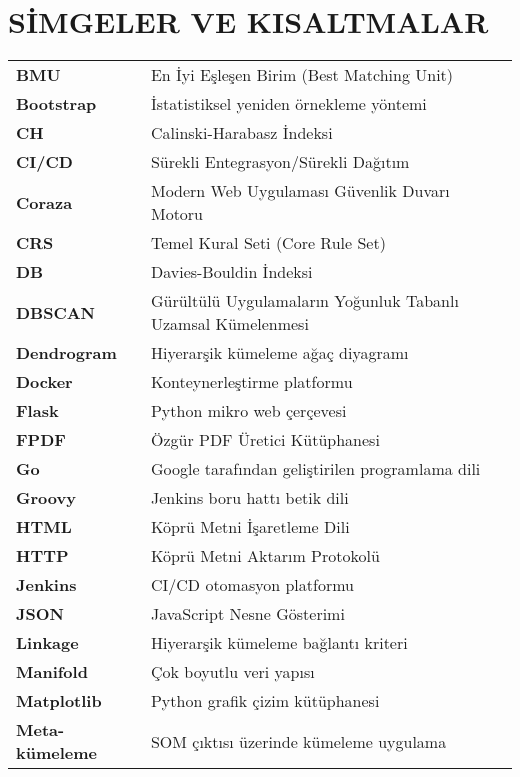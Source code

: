 \section*{SİMGELER VE KISALTMALAR}

\begin{spacing}{1.0}
\begin{longtable}{@{}p{} p{}@{}}
\textbf{BMU}  &	En İyi Eşleşen Birim (Best Matching Unit) \\[1ex]
\textbf{Bootstrap} & İstatistiksel yeniden örnekleme yöntemi \\[1ex]
\textbf{CH} & Calinski-Harabasz İndeksi \\[1ex]
\textbf{CI/CD}  &	Sürekli Entegrasyon/Sürekli Dağıtım \\[1ex]
\textbf{Coraza} & Modern Web Uygulaması Güvenlik Duvarı Motoru \\[1ex]
\textbf{CRS}  &	Temel Kural Seti (Core Rule Set) \\[1ex]
\textbf{DB} & Davies-Bouldin İndeksi \\[1ex]
\textbf{DBSCAN}  &	Gürültülü Uygulamaların Yoğunluk Tabanlı Uzamsal Kümelenmesi \\[1ex]
\textbf{Dendrogram} & Hiyerarşik kümeleme ağaç diyagramı \\[1ex]
\textbf{Docker} & Konteynerleştirme platformu \\[1ex]
\textbf{Flask} & Python mikro web çerçevesi \\[1ex]
\textbf{FPDF}  &	Özgür PDF Üretici Kütüphanesi \\[1ex]
\textbf{Go} & Google tarafından geliştirilen programlama dili \\[1ex]
\textbf{Groovy} & Jenkins boru hattı betik dili \\[1ex]
\textbf{HTML}  &	Köprü Metni İşaretleme Dili \\[1ex]
\textbf{HTTP}  &	Köprü Metni Aktarım Protokolü \\[1ex]
\textbf{Jenkins} & CI/CD otomasyon platformu \\[1ex]
\textbf{JSON}  &	JavaScript Nesne Gösterimi \\[1ex]
\textbf{Linkage} & Hiyerarşik kümeleme bağlantı kriteri \\[1ex]
\textbf{Manifold} & Çok boyutlu veri yapısı \\[1ex]
\textbf{Matplotlib} & Python grafik çizim kütüphanesi \\[1ex]
\textbf{Meta-kümeleme} & SOM çıktısı üzerinde kümeleme uygulama \\[1ex]

\end{longtable}
\end{spacing}
